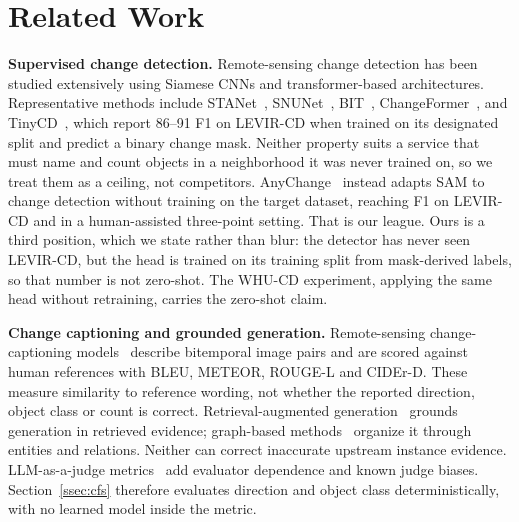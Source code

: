 \section{Related Work}

\textbf{Supervised change detection.} Remote-sensing change detection has been
studied extensively using Siamese CNNs and transformer-based architectures.
Representative methods include STANet~\cite{chen2020spatial},
SNUNet~\cite{fang2021snunet}, BIT~\cite{chen2021remote},
ChangeFormer~\cite{bandara2022transformer}, and
TinyCD~\cite{codegoni2023tinycd}, which report 86--91 F1 on LEVIR-CD when
trained on its designated split and predict a binary change mask. Neither
property suits a service that must name and count objects in a neighborhood it
was never trained on, so we treat them as a ceiling, not competitors.
AnyChange~\cite{zheng2024segment} instead adapts SAM to change detection
without training on the target dataset, reaching \AnyChangeFOne{} F1 on
LEVIR-CD and \AnyChangeHFOne{} in a human-assisted three-point setting. That is
our league. Ours is a third position, which we state rather than blur: the
detector has never seen LEVIR-CD, but the head is trained on its training split
from mask-derived labels, so that number is not zero-shot. The WHU-CD experiment,
applying the same head without retraining, carries the zero-shot claim.

\textbf{Change captioning and grounded generation.} Remote-sensing
change-captioning models~\cite{hoxha2022change,liu2022remote,liu2023progressive,chang2023changes} describe bitemporal image pairs and are scored against human
references with BLEU, METEOR, ROUGE-L and CIDEr-D. These measure similarity to
reference wording, not whether the reported direction, object class or count is
correct. Retrieval-augmented generation~\cite{lewis2020retrieval} grounds
generation in retrieved evidence; graph-based
methods~\cite{edge2024local} organize it through entities and relations. Neither
can correct inaccurate upstream instance evidence. LLM-as-a-judge
metrics~\cite{zheng2023judging} add evaluator dependence and known judge biases.
Section~\ref{ssec:cfs} therefore evaluates direction and object class
deterministically, with no learned model inside the metric.
